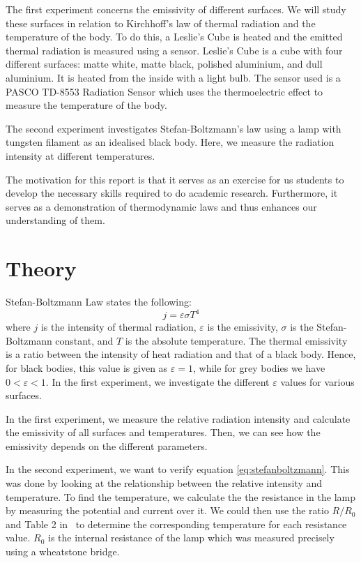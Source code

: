 \documentclass[5p,sort&compress]{elsarticle}
\begin{document}
The first experiment concerns the emissivity of different surfaces. We will study these surfaces in relation to Kirchhoff's law of thermal radiation and the temperature of the body. To do this, a Leslie's Cube is heated and the emitted thermal radiation is measured using a sensor. Leslie's Cube is a cube with four different surfaces: matte white, matte black, polished aluminium, and dull aluminium. It is heated from the inside with a light bulb. The sensor used is a PASCO TD-8553 Radiation Sensor which uses the thermoelectric effect to measure the temperature of the body. 

The second experiment investigates Stefan-Boltzmann's law using a lamp with tungsten filament as an idealised black body. Here, we measure the radiation intensity at different temperatures. 

The motivation for this report is that it serves as an exercise for us students to develop the necessary skills required to do academic research. Furthermore, it serves as a demonstration of thermodynamic laws and thus enhances our understanding of them.

\section{Theory}
Stefan-Boltzmann Law states the following:
\begin{equation}
    j = \varepsilon\sigma T^4
    \label{eq:stefanboltzmann}
\end{equation}
where $j$ is the intensity of thermal radiation,  $\varepsilon$ is the emissivity, $\sigma$ is the Stefan-Boltzmann constant, and $T$ is the absolute temperature. The thermal emissivity is a ratio between the intensity of heat radiation and that of a black body. Hence, for black bodies, this value is given as $\varepsilon =1$, while for grey bodies we have $0< \varepsilon <1$. In the first experiment, we investigate the different $\varepsilon$ values for various surfaces. 

In the first experiment, we measure the relative radiation intensity and calculate the emissivity of all surfaces and temperatures. Then, we can see how the emissivity depends on the different parameters.

In the second experiment, we want to verify equation \eqref{eq:stefanboltzmann}. This was done by looking at the relationship between the relative intensity and temperature. To find the temperature, we calculate the the resistance in the lamp by measuring the potential and current over it. We could then use the ratio $R/R_0$ and Table 2 in~\cite{pasco} to determine the corresponding temperature for each resistance value. $R_0$ is the internal resistance of the lamp which was measured precisely using a wheatstone bridge.
\end{document}
